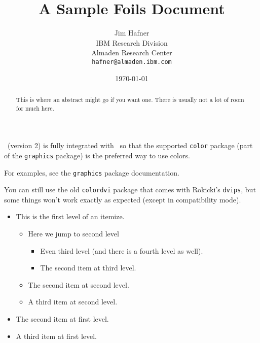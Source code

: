 \documentclass[17pt,fleqn,dvips]{foils}
\title{A Sample Foils Document}
\author{Jim Hafner\\
        IBM Research Division\\
        Almaden Research Center\\
       \texttt{hafner@almaden.ibm.com}
       }
\date{\today}
\begin{document}
\maketitle
%
\begin{abstract}
This is where an abstract might go if you want one.  There is usually
not a lot of room for much here.
\end{abstract}
%

\FoilTeX\ (version 2) is fully integrated with \LaTeXe\ so that the
supported \texttt{color} package (part of the \texttt{graphics}
package) is the preferred way to use colors.

For examples, see the \texttt{graphics} package documentation.

You can still use the old \texttt{colordvi} package that comes with
Rokicki's \texttt{dvips}, but some things won't work exactly as
expected (except in compatibility mode).

\LogoOff  %
%

\begin{itemize}
\item
This is the first level of an itemize.
  \begin{itemize}     %
  \item Here we jump to second level
     \begin{itemize}
     \item Even third level (and there is a fourth level as well).
     \item The second item at third level.
     \end{itemize}
  \item The second item at second level.
  \item A third item at second level.
  \end{itemize}
\item The second item at first level.
\item A third item at first level.
\end{itemize}
\end{document}
